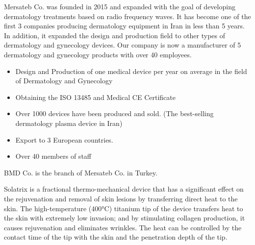 \documentclass[10pt,a4paper,ragged2e,withhyper]{altacv}
\begin{document}

\makecvheader



\begin{paracol}{2}


{Mersateb Co. was founded in 2015 and expanded with the goal of developing dermatology treatments based on radio frequency waves. It has become one of the first 3 companies producing dermatology equipment in Iran in less than 5 years. In addition, it expanded the design and production field to other types of dermatology and gynecology devices. Our company is now a manufacturer of 5 dermatology and gynecology products with over 40 employees.\par \bigskip}
\begin{itemize}
\item Design and Production of one medical device per year on average in the field of Dermatology and Gynecology
\item Obtaining the ISO 13485 and Medical CE Certificate
\item Over 1000 devices have been produced and sold. (The best-selling dermatology plasma device in Iran)
\item Export to 3 European countries.
\item Over 40 members of staff
\end{itemize}

\divider

BMD Co. is the branch of Mersateb Co. in Turkey. 


Solatrix is a fractional thermo-mechanical device that has a significant effect on the rejuvenation and removal of skin lesions by transferring direct heat to the skin. The high-temperature (400°C) titanium tip of the device transfers heat to the skin with extremely low invasion; and by stimulating collagen production, it causes rejuvenation and eliminates wrinkles. The heat can be controlled by the contact time of the tip with the skin and the penetration depth of the tip.


\end{paracol}
\end{document}
